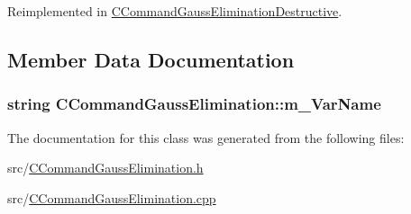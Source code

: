 Reimplemented in \hyperlink{classCCommandGaussEliminationDestructive_a6bb98f06cdb90b5dbe129286d7d08cc7}{C\+Command\+Gauss\+Elimination\+Destructive}.



\subsection{Member Data Documentation}
\subsubsection[{\texorpdfstring{m\+\_\+\+Var\+Name}{m_VarName}}]{\setlength{\rightskip}{0pt plus 5cm}string C\+Command\+Gauss\+Elimination\+::m\+\_\+\+Var\+Name\hspace{0.3cm}{\ttfamily [protected]}}\hypertarget{classCCommandGaussElimination_a2e619e3d9fb79bca7076ab72c21c09b4}{}\label{classCCommandGaussElimination_a2e619e3d9fb79bca7076ab72c21c09b4}


The documentation for this class was generated from the following files\+:\begin{DoxyCompactItemize}
\item 
src/\hyperlink{CCommandGaussElimination_8h}{C\+Command\+Gauss\+Elimination.\+h}\item 
src/\hyperlink{CCommandGaussElimination_8cpp}{C\+Command\+Gauss\+Elimination.\+cpp}\end{DoxyCompactItemize}
